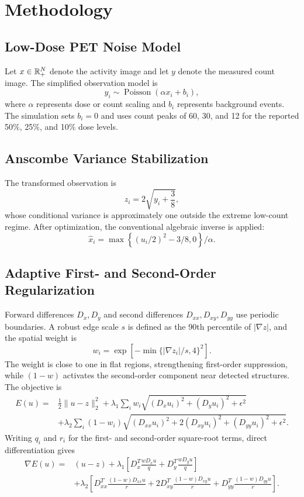 \section{Methodology}
\subsection{Low-Dose PET Noise Model}
Let $x\in\mathbb{R}_+^N$ denote the activity image and let $y$ denote the measured count image. The simplified observation model is
\begin{equation}
y_i\sim\operatorname{Poisson}(\alpha x_i+b_i),
\label{eq:poisson}
\end{equation}
where $\alpha$ represents dose or count scaling and $b_i$ represents background events. The simulation sets $b_i=0$ and uses count peaks of 60, 30, and 12 for the reported 50\%, 25\%, and 10\% dose levels.

\subsection{Anscombe Variance Stabilization}
The transformed observation is
\begin{equation}
z_i=2\sqrt{y_i+\frac{3}{8}},
\label{eq:anscombe}
\end{equation}
whose conditional variance is approximately one outside the extreme low-count regime. After optimization, the conventional algebraic inverse is applied:
\begin{equation}
\widehat{x}_i=\max\!\left\{(u_i/2)^2-3/8,0\right\}/\alpha.
\label{eq:inverse}
\end{equation}

\subsection{Adaptive First- and Second-Order Regularization}
Forward differences $D_x,D_y$ and second differences $D_{xx},D_{xy},D_{yy}$ use periodic boundaries. A robust edge scale $s$ is defined as the 90th percentile of $|\nabla z|$, and the spatial weight is
\begin{equation}
w_i=\exp\left[-\min\{|\nabla z_i|/s,4\}^2\right].
\label{eq:weight}
\end{equation}
The weight is close to one in flat regions, strengthening first-order suppression, while $(1-w)$ activates the second-order component near detected structures. The objective is
\begin{align}
E(u)=&\tfrac12\|u-z\|_2^2
+\lambda_1\sum_iw_i\sqrt{(D_xu_i)^2+(D_yu_i)^2+\epsilon^2}\nonumber\\
&+\lambda_2\sum_i(1-w_i)
\sqrt{(D_{xx}u_i)^2+2(D_{xy}u_i)^2+(D_{yy}u_i)^2+\epsilon^2}.
\label{eq:objective}
\end{align}
Writing $q_i$ and $r_i$ for the first- and second-order square-root terms, direct differentiation gives
\begin{align}
\nabla E(u)=&(u-z)+\lambda_1\left[
D_x^T\frac{wD_xu}{q}+D_y^T\frac{wD_yu}{q}\right]\nonumber\\
&+\lambda_2\left[
D_{xx}^T\frac{(1-w)D_{xx}u}{r}
+2D_{xy}^T\frac{(1-w)D_{xy}u}{r}
+D_{yy}^T\frac{(1-w)D_{yy}u}{r}\right].
\label{eq:gradient}
\end{align}

